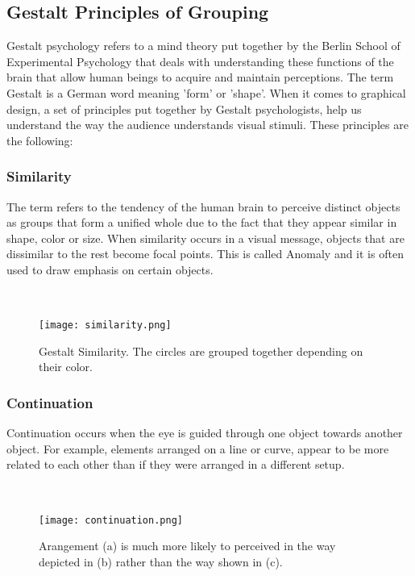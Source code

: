 \documentclass[16pt]{extreport}
\begin{document}
\subsection{Gestalt Principles of Grouping}
\parbox{\linewidth}{
\justify
\large{Gestalt psychology refers to a mind theory put together by the Berlin School of Experimental Psychology that deals with understanding these functions of the brain that allow human beings to acquire and maintain perceptions. The term Gestalt is a German word meaning 'form' or 'shape'. When it comes to graphical design, a set of principles put together by Gestalt psychologists, help us understand the way the audience understands visual stimuli.  These principles are the following: }}\clearpage
\subsubsection{Similarity}
\parbox{\linewidth}{
	\justify
	\large{
	The term refers to the tendency of the human brain to perceive distinct objects as groups that form a unified whole due to the fact that they appear similar in shape, color or size. When similarity occurs in a visual 	message, objects that are dissimilar to the rest become focal points. This is called Anomaly and it is often used to draw emphasis on certain objects. }}
\hfill \break \\[1cm]
	
	\begin{center}
	\begin{figure}[h]
		\centering
		\texttt{[image: similarity.png]}
		\caption[]{Gestalt Similarity. The circles are grouped together depending on their color.}
	\end{figure}
	\end{center}
	\clearpage
	
\subsubsection{Continuation}
	\parbox{\linewidth}{
	\justify
	\large{
	Continuation occurs when the eye is guided through one object towards another object. For example, elements arranged on a line or curve, appear to be more related to each other than if they were arranged in a different setup.}}
\hfill \break \\[1cm]
	\begin{center}
	\begin{figure}[h]
		\centering
		\texttt{[image: continuation.png]}
		\caption[]{Arangement (a) is much more likely to perceived in the way depicted in (b) rather than the way shown in (c).}
	\end{figure}
	\end{center}
	\clearpage
	
\end{document}
